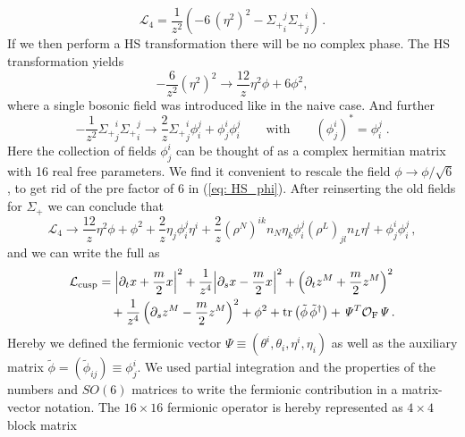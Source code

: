 %
%
\begin{equation}
\mathcal{L}_4= \frac{1}{z^2}\left(- 6\, (\eta^2)^2 - {\Sigma_{+}}_i^j{\Sigma_{+}}_j^i \right)\,.
\end{equation}
%
%
If we then perform a HS transformation there will be no complex phase. The HS transformation yields
%
%
\begin{equation}
 -\frac{6}{z^2}(\eta^2)^2\to \frac{12}{z} \eta^2 \phi +6\phi^2,
 \label{eq: HS_phi}
\end{equation}
%
%
where a single bosonic field was introduced like in the naive case. And further
%
%
\begin{equation}
-\frac{1}{z^{2}}{\Sigma_{+}}^{i}_{j}{\Sigma_{+}}^{j}_{i} \rightarrow \frac{2}{z}{\Sigma_{+}}^{i}_{j}\phi^{j}_{i} + \phi^{i}_{j}\phi^{j}_{i}
\qquad \text{with} \qquad \left(\phi^{i}_{j}\right)^{\ast} = \phi^{j}_{i}\;.
\end{equation}
%
%
Here the collection of fields $\phi^{i}_{j}$ can be thought of as a complex hermitian matrix with 16 real free parameters. We find it convenient to rescale the field $\phi \to \phi / \sqrt{6}$, to get rid of the pre factor of 6 in (\ref{eq: HS_phi}). After reinserting the old fields for $\Sigma_{+}$ we can conclude that
%
%
\begin{equation}
 \mathcal{L}_4\to \frac{12}{z} \eta^2 \phi +\phi^2+\frac{2}{z}\eta_j \phi^j_i \eta^i +\frac{2}{z} (\rho^N)^{ik}n_N \eta_k\phi^j_i  (\rho^L)_{jl}n_L  \eta^l+\phi^i_j \phi^j_i\,,
\end{equation}
%
%
and we can write the full  as
%
%
\begin{align}
\mathcal{L}_{\rm cusp} &=  {\left\vert \partial_t {x} + {\frac{m}{2}}{x} \right\vert}^2 + \frac{1}{{ z}^4}{\left\vert \partial_s {x} -\frac{m}{2}{x} \right\vert}^2 + \left(\partial_t {z}^M + \frac{m}{2}{z}^M \right)^2 \\ &\quad+ \frac{1}{{ z}^4} \left(\partial_s {z}^M -\frac{m}{2}{z}^M\right)^2
+ \phi^2 + {\rm tr} \left( \tilde{\phi}\, \tilde{\phi}^{\dagger} \right) + \mathit{\Psi}^T \mathcal{O}_{\rm F} \mathit{\Psi} \,. \notag
\end{align}
%
%
Hereby we defined the fermionic vector $\mathit{\Psi}\equiv (\theta^{i},\theta_{i},\eta^{i},\eta_{i})$ as well as the auxiliary matrix ${\tilde{\phi}= (\tilde{\phi}_{ij}) \equiv \phi^{i}_{j}}$. We used partial integration and the properties of the  numbers and $SO(6)$ matrices to write the fermionic contribution in a matrix-vector notation. The $16\times 16$ fermionic operator is hereby represented as $4\times 4$ block matrix

